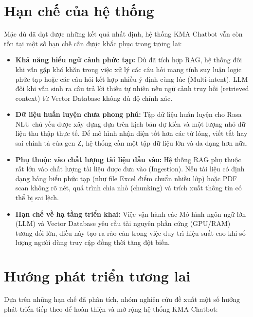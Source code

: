 \section{Hạn chế của hệ thống}
Mặc dù đã đạt được những kết quả nhất định, hệ thống KMA Chatbot vẫn còn tồn tại một số hạn chế cần được khắc phục trong tương lai:

\begin{itemize}
    \item \textbf{Khả năng hiểu ngữ cảnh phức tạp:} Dù đã tích hợp RAG, hệ thống đôi khi vẫn gặp khó khăn trong việc xử lý các câu hỏi mang tính suy luận logic phức tạp hoặc các câu hỏi kết hợp nhiều ý định cùng lúc (Multi-intent). LLM đôi khi vẫn sinh ra câu trả lời thiếu tự nhiên nếu ngữ cảnh truy hồi (retrieved context) từ Vector Database không đủ độ chính xác.
    \item \textbf{Dữ liệu huấn luyện chưa phong phú:} Tập dữ liệu huấn luyện cho Rasa NLU chủ yếu được xây dựng dựa trên kịch bản dự kiến và một lượng nhỏ dữ liệu thu thập thực tế. Để mô hình nhận diện tốt hơn các từ lóng, viết tắt hay sai chính tả của gen Z, hệ thống cần một tập dữ liệu lớn và đa dạng hơn nữa.
    \item \textbf{Phụ thuộc vào chất lượng tài liệu đầu vào:} Hệ thống RAG phụ thuộc rất lớn vào chất lượng tài liệu được đưa vào (Ingestion). Nếu tài liệu có định dạng bảng biểu phức tạp (như file Excel điểm chuẩn nhiều lớp) hoặc PDF scan không rõ nét, quá trình chia nhỏ (chunking) và trích xuất thông tin có thể bị sai lệch.
    \item \textbf{Hạn chế về hạ tầng triển khai:} Việc vận hành các Mô hình ngôn ngữ lớn (LLM) và Vector Database yêu cầu tài nguyên phần cứng (GPU/RAM) tương đối lớn, điều này tạo ra rào cản trong việc duy trì hiệu suất cao khi số lượng người dùng truy cập đồng thời tăng đột biến.
\end{itemize}

\section{Hướng phát triển tương lai}
Dựa trên những hạn chế đã phân tích, nhóm nghiên cứu đề xuất một số hướng phát triển tiếp theo để hoàn thiện và mở rộng hệ thống KMA Chatbot:

